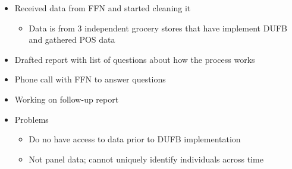 \documentclass[11pt,letterpaper,]{book}
\providecommand{\tightlist}{%
  \setlength{\itemsep}{0pt}\setlength{\parskip}{0pt}}
\begin{document}
\begin{itemize}
\tightlist
\item
  Received data from FFN and started cleaning it

  \begin{itemize}
  \tightlist
  \item
    Data is from 3 independent grocery stores that have implement DUFB
    and gathered POS data
  \end{itemize}
\item
  Drafted report with list of questions about how the process works
\item
  Phone call with FFN to answer questions
\item
  Working on follow-up report
\item
  Problems

  \begin{itemize}
  \tightlist
  \item
    Do no have access to data prior to DUFB implementation
  \item
    Not panel data; cannot uniquely identify individuals across time
  \end{itemize}
\end{itemize}


\end{document}
